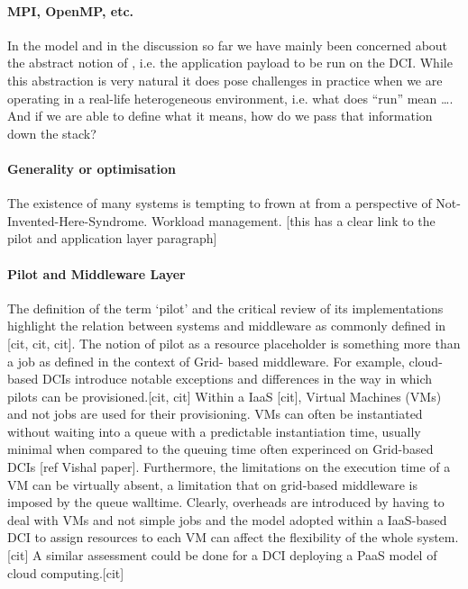 \documentclass{sig-alternate}
\begin{document}
\paragraph*{MPI, OpenMP, etc.} In the \pstar model and in the discussion so far
we have mainly been concerned about the abstract notion of , i.e.
the application payload to be run on the DCI.
While this abstraction is very natural it does pose challenges in practice when
we are operating in a real-life heterogeneous environment, i.e. what does
``run'' mean \ldots. And if we are able to define what it means, how do we pass
that information down the stack?

\paragraph*{Generality or optimisation} The existence of many \pilot systems
is tempting to frown at from a perspective of Not-Invented-Here-Syndrome.
Workload management. [this has a clear link to the pilot and application layer
paragraph]

\paragraph*{Pilot and Middleware Layer} The definition of the term
`pilot' and the critical review of its implementations highlight the
relation between \pilot systems and middleware as commonly defined in
[cit, cit, cit]. The notion of pilot as a resource placeholder is
something more than a job as defined in the context of Grid- based
middleware. For example, cloud-based DCIs  introduce notable exceptions
and differences in the way in which pilots can be provisioned.[cit, cit]
Within a IaaS [cit], Virtual Machines (VMs) and not jobs are used for
their provisioning. VMs can often be instantiated without waiting into a
queue  with a predictable instantiation time, usually minimal when
compared to the queuing time often experinced on Grid-based DCIs [ref
Vishal paper]. Furthermore, the limitations on the execution time of a
VM can be virtually absent, a limitation that on grid-based middleware
is imposed by the queue walltime. Clearly, overheads are introduced by
having to deal with VMs and not simple jobs and the model adopted within
a IaaS-based DCI to assign resources to each VM can affect the
flexibility of the whole \pilotjob system. [cit] A similar assessment
could be done for a DCI deploying a PaaS model of cloud computing.[cit]
\end{document}
